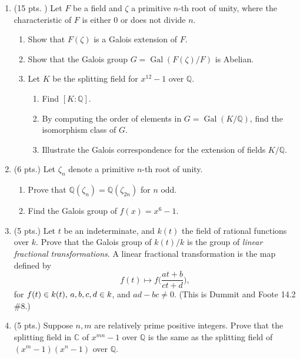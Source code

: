 \documentclass[11pt]{report}
\newcommand\QQ{\mathbb Q}
\newcommand\C{\mathbb C}
\newcommand\Gal{\operatorname{Gal}}
\begin{document}
\begin{enumerate}
\item (15 pts. )  Let $F$ be a field and $\zeta$ a primitive $n$-th  root of unity, 
where the characteristic of $F$ is either $0$ or does not divide $n$.

\begin{enumerate}

\item Show that $F(\zeta)$ is a Galois extension of $F$.

\item Show that the Galois group $G = \Gal (F(\zeta) / F)$ is Abelian.

\item Let $K$ be the splitting field for $x^{12} - 1$ over $\QQ$.

\begin{enumerate}

\item Find $[K : \QQ]$.

\item By computing the order of elements in $G = \Gal (K / \QQ)$, find the isomorphism
class of $G$.

\item Illustrate the Galois correspondence for the extension of fields $K / \QQ$.

\end{enumerate}

\end{enumerate}

\item (6 pts.) Let $\zeta_n$ denote a primitive $n$-th root of unity.

\begin{enumerate}

\item Prove that $\QQ ( \zeta_n ) = \QQ( \zeta_{2n} )$ for $n$ odd.

\item Find the Galois group of $f(x) = x^6 - 1$.
 
\end{enumerate}

\item (5 pts.) Let $t$ be an indeterminate, and $k(t)$ the field of rational functions over $k$.  Prove that the
Galois group of $k(t) / k$ is the group of \emph{linear fractional transformations}.  A linear fractional
transformation is the map defined by 
$$
f(t) \mapsto f \bigg( \frac{at + b}{ct + d} \bigg),
$$ 
for $f(t) \in k(t),  \thinspace a,b,c,d \in k$, and $ad - bc \neq 0$.  (This is Dummit and Foote 14.2 \#8.)

\item (5 pts.)
Suppose $n, m$ are relatively prime positive integers.  Prove that the splitting field in $\C$ of
$x^{mn} - 1$ over $\QQ$ is the same as the splitting field of $(x^m - 1) (x^n - 1)$ over $\QQ$.

\end{enumerate}
\end{document}
